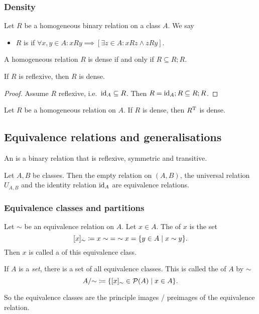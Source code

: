 \subsubsection{Density}
\begin{definition}
Let $R$ be a homogeneous binary relation on a class $A$. We say
\begin{itemize}
\item $R$ is  if $\forall x,y\in A: xRy \implies [\exists z\in A: xRz \land zRy]$.
\end{itemize}
\end{definition}

\begin{lemma}
A homogeneous relation $R$ is dense \textup{if and only if} $R \subseteq R;R$.
\end{lemma}
\begin{lemma}
If $R$ is reflexive, then $R$ is dense.
\end{lemma}
\begin{proof}
Assume $R$ reflexive, i.e.\ $\operatorname{id}_A\subseteq R$. Then $R = \operatorname{id}_A ;R \subseteq R;R$.
\end{proof}

\begin{lemma}
Let $R$ be a homogeneous relation on $A$. If $R$ is dense, then $R^{\mathrm{T}}$ is dense.
\end{lemma}

\subsection{Equivalence relations and generalisations}
\begin{definition}
An  is a binary relation that is reflexive, symmetric and transitive.
\end{definition}

\begin{lemma}
Let $A,B$ be classes. Then the empty relation on $(A,B)$, the universal relation $U_{A,B}$ and the identity relation $\operatorname{id}_A$ are equivalence relations.
\end{lemma}

\subsubsection{Equivalence classes and partitions}
\begin{definition}
Let $\sim$ be an equivalence relation on $A$. Let $x\in A$. The  of $x$ is the set
\[ [x]_\sim \defeq {x\sim} = {\sim x} = \setbuilder{y\in A}{x\sim y}. \]
Then $x$ is called a  of this equivalence class.

If $A$ is a \emph{set}, there is a set of all equivalence classes. This is called the  of $A$ by $\sim$
\[ A/{\sim} \defeq \setbuilder{[x]_\sim \in \powerset(A)}{x\in A}. \]
\end{definition}
So the equivalence classes are the principle images / preimages of the equivalence relation.

